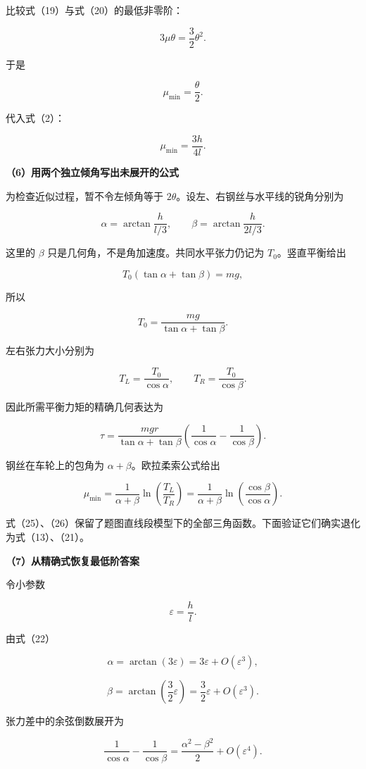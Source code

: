 \documentclass[12pt,a4paper,UTF8]{ctexart}
\begin{document}
比较式（19）与式（20）的最低非零阶：

\[
3\mu\theta=\frac32\theta^2.
\]

于是

\[
\mu_{\min}=\frac\theta2.
\]

代入式（2）：

\[
\boxed{
\mu_{\min}=\frac{3h}{4l}
}.
\tag{21}
\]

\textbf{（6）用两个独立倾角写出未展开的公式}

为检查近似过程，暂不令左倾角等于
\(2\theta\)。设左、右钢丝与水平线的锐角分别为

\[
\alpha=\arctan\frac{h}{l/3},
\qquad
\beta=\arctan\frac{h}{2l/3}.
\tag{22}
\]

这里的 \(\beta\) 只是几何角，不是角加速度。共同水平张力仍记为
\(T_0\)。竖直平衡给出

\[
T_0(\tan\alpha+\tan\beta)=mg,
\]

所以

\[
T_0=\frac{mg}{\tan\alpha+\tan\beta}.
\tag{23}
\]

左右张力大小分别为

\[
T_L=\frac{T_0}{\cos\alpha},
\qquad
T_R=\frac{T_0}{\cos\beta}.
\tag{24}
\]

因此所需平衡力矩的精确几何表达为

\[
\boxed{
\tau
=\frac{mgr}{\tan\alpha+\tan\beta}
\left(
\frac1{\cos\alpha}-\frac1{\cos\beta}
\right)
}.
\tag{25}
\]

钢丝在车轮上的包角为 \(\alpha+\beta\)。欧拉柔索公式给出

\[
\boxed{
\mu_{\min}
=\frac1{\alpha+\beta}
\ln\left(\frac{T_L}{T_R}\right)
=\frac1{\alpha+\beta}
\ln\left(\frac{\cos\beta}{\cos\alpha}\right)
}.
\tag{26}
\]

式（25）、（26）保留了题图直线段模型下的全部三角函数。下面验证它们确实退化为式（13）、（21）。

\textbf{（7）从精确式恢复最低阶答案}

令小参数

\[
\varepsilon=\frac hl.
\]

由式（22）

\[
\alpha=\arctan(3\varepsilon)
=3\varepsilon+O(\varepsilon^3),
\]

\[
\beta=\arctan\left(\frac32\varepsilon\right)
=\frac32\varepsilon+O(\varepsilon^3).
\tag{27}
\]

张力差中的余弦倒数展开为

\[
\frac1{\cos\alpha}-\frac1{\cos\beta}
=\frac{\alpha^2-\beta^2}{2}
+O(\varepsilon^4).
\tag{28}
\]
\end{document}
